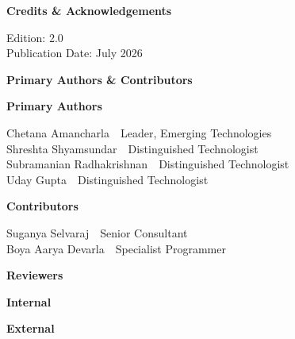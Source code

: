 \clearpage
\thispagestyle{empty}

{\color{TNTeal}\fontsize{24}{28}\selectfont\bfseries Credits \& Acknowledgements\par}
\vspace{1.2cm}

{\color{TNBodyText}\fontsize{11}{14}\selectfont
Edition: 2.0\\
Publication Date: July 2026\par}

\vspace{1.3cm}

{\color{TNTeal}\fontsize{20}{24}\selectfont\bfseries Primary Authors \& Contributors\par}
\vspace{0.6cm}

\noindent
\begin{minipage}[t]{0.48\textwidth}
{\color{TNBodyText}\fontsize{12}{16}\selectfont\bfseries Primary Authors\par}
\vspace{0.25cm}
{\color{TNBodyText}\fontsize{12}{16}\selectfont
Chetana Amancharla\ \textbar\ Leader, Emerging Technologies\\
Shreshta Shyamsundar\ \textbar\ Distinguished Technologist\\
Subramanian Radhakrishnan\ \textbar\ Distinguished Technologist\\
Uday Gupta\ \textbar\ Distinguished Technologist\par}
\end{minipage}\hfill
\begin{minipage}[t]{0.48\textwidth}
{\color{TNBodyText}\fontsize{12}{16}\selectfont\bfseries Contributors\par}
\vspace{0.25cm}
{\color{TNBodyText}\fontsize{12}{16}\selectfont
Suganya Selvaraj\ \textbar\ Senior Consultant\\
Boya Aarya Devarla\ \textbar\ Specialist Programmer\par}
\end{minipage}

\vspace{1.1cm}

{\color{TNTeal}\fontsize{20}{24}\selectfont\bfseries Reviewers\par}
\vspace{0.6cm}

\noindent
\begin{minipage}[t]{0.48\textwidth}
{\color{TNBodyText}\fontsize{12}{16}\selectfont\bfseries Internal\par}
\vspace{0.25cm}
\end{minipage}\hfill
\begin{minipage}[t]{0.48\textwidth}
{\color{TNBodyText}\fontsize{12}{16}\selectfont\bfseries External\par}
\vspace{0.25cm}
\end{minipage}

